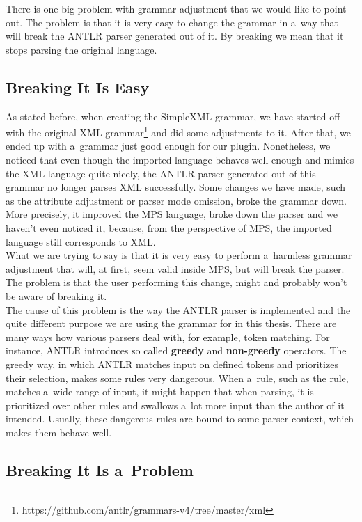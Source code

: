 There is one big problem with grammar adjustment that we would like to point out.
The problem is that it is very easy to change the grammar in a~way that will break the ANTLR parser generated out of it.
By breaking we mean that it stops parsing the original language.

\subsection{Breaking It Is Easy}

As stated before, when creating the SimpleXML grammar, we have started off with the original XML grammar\footnote{https://github.com/antlr/grammars-v4/tree/master/xml} and did some adjustments to it.
After that, we ended up with a~grammar just good enough for our plugin.
Nonetheless, we noticed that even though the imported language behaves well enough and mimics the XML language quite nicely, the ANTLR parser generated out of this grammar no longer parses XML successfully.
Some changes we have made, such as the attribute adjustment or parser mode omission, broke the grammar down.
More precisely, it improved the MPS language, broke down the parser and we haven't even noticed it, because, from the perspective of MPS, the imported language still corresponds to XML.
\\

What we are trying to say is that it is very easy to perform a~harmless grammar adjustment that will, at first, seem valid inside MPS, but will break the parser.
The problem is that the user performing this change, might and probably won't be aware of breaking it.
\\

The cause of this problem is the way the ANTLR parser is implemented and the quite different purpose we are using the grammar for in this thesis.
There are many ways how various parsers deal with, for example, token matching.
For instance, ANTLR introduces so called \textbf{greedy} and \textbf{non-greedy} operators.
The greedy way, in which ANTLR matches input on defined tokens and prioritizes their selection, makes some rules very dangerous.
When a~rule, such as the  rule, matches a~wide range of input, it might happen that when parsing, it is prioritized over other rules and swallows a~lot more input than the author of it intended.
Usually, these dangerous rules are bound to some parser context, which makes them behave well.

\subsection{Breaking It Is a~Problem}

